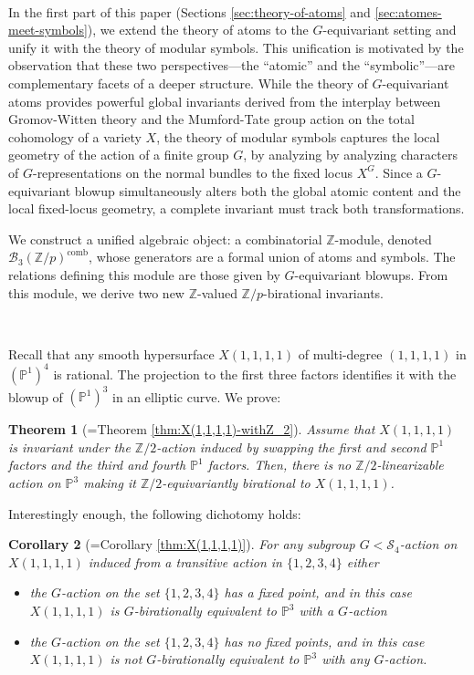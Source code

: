 \documentclass[12pt,a4paper]{amsart}
\newtheorem{Mtheorem}{Theorem}
\newtheorem{Mcorollary}[Mtheorem]{Corollary}
\theoremstyle{definition}
\theoremstyle{remark}
\begin{document}
\ 

In the first part of this paper (Sections \ref{sec:theory-of-atoms} and \ref{sec:atomes-meet-symbols}), we extend the theory of atoms to the \(G\)-equivariant setting and unify it with the theory of modular symbols. This unification is motivated by the observation that these two perspectives---the ``atomic'' and the ``symbolic''---are complementary facets of a deeper structure. While the theory of \(G\)-equivariant atoms provides powerful global invariants derived from the interplay between Gromov-Witten theory and the Mumford-Tate group action on the total cohomology of a variety \(X\), the theory of modular symbols captures the local geometry of the action of a finite group $G$, by analyzing by analyzing characters of \(G\)-representations on the normal bundles to the fixed locus \(X^G\). Since a \(G\)-equivariant blowup simultaneously alters both the global atomic content and the local fixed-locus geometry, a complete invariant must track both transformations.

We construct a unified algebraic object: a combinatorial \(\mathbb{Z}\)-module, denoted \(\mathcal{B}_3(\mathbb{Z}/p)^{\text{comb}}\), whose generators are a formal union of atoms and symbols. The relations defining this module are those given by \(G\)-equivariant blowups. From this module, we derive two new \(\mathbb{Z}\)-valued \(\mathbb{Z}/p\)-birational invariants.


\


Recall that any smooth hypersurface $X(1,1,1,1)$ of multi-degree $(1,1,1,1)$ in
\((\mathbb{P}^1)^4\) is rational. The projection to the first three factors identifies it with the blowup of  \((\mathbb{P}^1)^3\) in an elliptic curve. We prove:
\begin{Mtheorem}[=Theorem \ref{thm:X(1,1,1,1)-withZ_2}]\label{Mthm:X(1,1,1,1)-withZ_2}
    Assume that \( X(1,1,1,1) \) is invariant under the \(\mathbb Z/2\)-action induced by swapping the first and second \(\mathbb{P}^1\) factors and the third and fourth \(\mathbb{P}^1\) factors. Then, there is no \(\mathbb Z/2\)-linearizable action on \(\mathbb{P}^3\) making it \(\mathbb Z/2\)-equivariantly birational to \( X(1,1,1,1) \).
\end{Mtheorem}

Interestingly enough, the following dichotomy holds:
\begin{Mcorollary}[=Corollary \ref{thm:X(1,1,1,1)}]\label{cor:general}
    For any subgroup $G<\mathcal S_4$-action on $X(1,1,1,1)$ induced from a transitive action in $\{1, 2, 3, 4\}$ either
\begin{itemize}
\item[$(a)$] the $G$-action on the set $\{1,2,3,4\}$ has a fixed point, and in this case $X(1,1,1,1)$ is $G$-birationally equivalent to $\mathbb P^3$ with a $G$-action
\item[$(b)$] the $G$-action on the set $\{1,2,3,4\}$ has no fixed points, and in this case $X(1,1,1,1)$ is not $G$-birationally equivalent to $\mathbb P^3$ with any $G$-action.
\end{itemize}
\end{Mcorollary}
\end{document}

